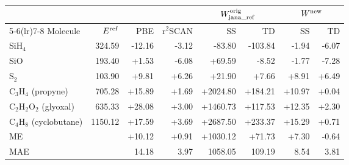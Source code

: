 \begin{tabular}{@{}l r rr rr rr@{}}
\toprule
 & & & & \multicolumn{2}{c}{$W^{\rm orig}_{\rm jana\_ref}$} & \multicolumn{2}{c}{$W^{\rm new}$} \\
\cmidrule(lr){5-6}\cmidrule(lr){7-8}
Molecule & $E^{\rm ref}$ & PBE & r$^2$SCAN & SS & TD & SS & TD \\
\midrule
SiH$_4$ & 324.59 & \textcolor{pyscfred}{-12.16} & \textcolor{pyscfred}{-3.12} & \textcolor{pyscfred}{-83.80} & \textcolor{pyscfred}{-103.84} & \textcolor{pyscfred}{-1.94} & \textcolor{pyscfred}{-6.07} \\
SiO & 193.40 & \textcolor{pyscfred}{+1.53} & \textcolor{pyscfred}{-6.08} & \textcolor{pyscfred}{+69.59} & \textcolor{pyscfred}{-8.52} & \textcolor{pyscfred}{-1.77} & \textcolor{pyscfred}{-7.28} \\
S$_2$ & 103.90 & \textcolor{pyscfred}{+9.81} & \textcolor{pyscfred}{+6.26} & \textcolor{pyscfred}{+21.90} & \textcolor{pyscfred}{+7.66} & \textcolor{pyscfred}{+8.91} & \textcolor{pyscfred}{+6.49} \\
C$_3$H$_4$ (propyne) & 705.28 & \textcolor{pyscfred}{+15.89} & \textcolor{pyscfred}{+1.69} & \textcolor{pyscfred}{+2024.80} & \textcolor{pyscfred}{+184.21} & \textcolor{pyscfred}{+10.97} & \textcolor{pyscfred}{+0.04} \\
C$_2$H$_2$O$_2$ (glyoxal) & 635.33 & \textcolor{pyscfred}{+28.08} & \textcolor{pyscfred}{+3.00} & \textcolor{pyscfred}{+1460.73} & \textcolor{pyscfred}{+117.53} & \textcolor{pyscfred}{+12.35} & \textcolor{pyscfred}{+2.30} \\
C$_4$H$_8$ (cyclobutane) & 1150.12 & \textcolor{pyscfred}{+17.59} & \textcolor{pyscfred}{+3.69} & \textcolor{pyscfred}{+2687.50} & \textcolor{pyscfred}{+233.37} & \textcolor{pyscfred}{+15.29} & \textcolor{pyscfred}{+0.71} \\
\midrule
ME & & \textcolor{pyscfred}{+10.12} & \textcolor{pyscfred}{+0.91} & \textcolor{pyscfred}{+1030.12} & \textcolor{pyscfred}{+71.73} & \textcolor{pyscfred}{+7.30} & \textcolor{pyscfred}{-0.64} \\
MAE & & \textcolor{pyscfred}{14.18} & \textcolor{pyscfred}{3.97} & \textcolor{pyscfred}{1058.05} & \textcolor{pyscfred}{109.19} & \textcolor{pyscfred}{8.54} & \textcolor{pyscfred}{3.81} \\
\bottomrule
\end{tabular}
